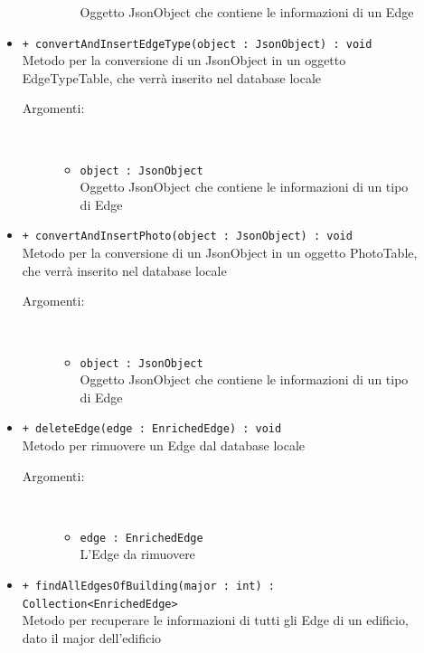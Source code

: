 \documentclass[../DefinizioneDiProdotto.tex]{subfiles}
\begin{document}
\begin{description}
\begin{itemize}
\begin{description}
\begin{itemize}
				Oggetto JsonObject che contiene le informazioni di un Edge\end{itemize}
		\end{description}
		\item \texttt{+ convertAndInsertEdgeType(object : JsonObject) : void}\\
		Metodo per la conversione di un JsonObject in un oggetto EdgeTypeTable, che verrà inserito nel database locale
		\begin{description}
			\item[Argomenti:] \
			\begin{itemize}
				\item \texttt{object : JsonObject}\\
				Oggetto JsonObject che contiene le informazioni di un tipo di Edge\end{itemize}
		\end{description}
		\item \texttt{+ convertAndInsertPhoto(object : JsonObject) : void}\\
		Metodo per la conversione di un JsonObject in un oggetto PhotoTable, che verrà inserito nel database locale
		\begin{description}
			\item[Argomenti:] \
			\begin{itemize}
				\item \texttt{object : JsonObject}\\
				Oggetto JsonObject che contiene le informazioni di un tipo di Edge\end{itemize}
		\end{description}
		\item \texttt{+ deleteEdge(edge : EnrichedEdge) : void}\\
		Metodo per rimuovere un Edge dal database locale
		\begin{description}
			\item[Argomenti:] \
			\begin{itemize}
				\item \texttt{edge : EnrichedEdge}\\
				L'Edge da rimuovere\end{itemize}
		\end{description}
		\item \texttt{+ findAllEdgesOfBuilding(major : int) : Collection<EnrichedEdge>}\\
		Metodo per recuperare le informazioni di tutti gli Edge di un edificio, dato il major dell'edificio
		\begin{description}

\end{description}
\end{itemize}
\end{description}
\end{document}
